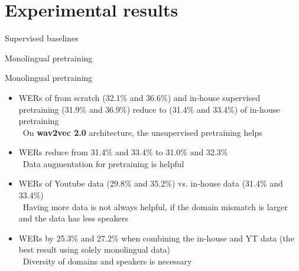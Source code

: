 \section{Experimental results}


\begin{frame}{Supervised baselines}
    
\end{frame}

\begin{frame}{Monolingual pretraining}

\end{frame}    

\begin{frame}{Monolingual pretraining}
\begin{itemize}
    \item WERs of from scratch (32.1\% and 36.6\%) and in-house supervised pretraining (31.9\% and 36.9\%) reduce to (31.4\% and 33.4\%) of in-house pretraining 
    \\ \textrightarrow \, 
    On \textbf{wav2vec 2.0} architecture, the unsupervised pretraining helps 
    
    \item WERs reduce from 31.4\% and 33.4\% to 31.0\% and 32.3\% 
    \\ \textrightarrow \,
    Data augmentation for pretraining is helpful
    
    \item WERs of Youtube data (29.8\% and 35.2\%) vs. in-house data (31.4\% and 33.4\%) 
    \\ \textrightarrow \,
    Having more data is not always helpful, if the domain mismatch is larger and the data has less speakers
    
    \item WERs by 25.3\% and 27.2\% when combining the in-house and YT data (the best result using solely monolingual data)
    \\ \textrightarrow \,
    Diversity of domains and speakers is necessary
\end{itemize}
\end{frame}
